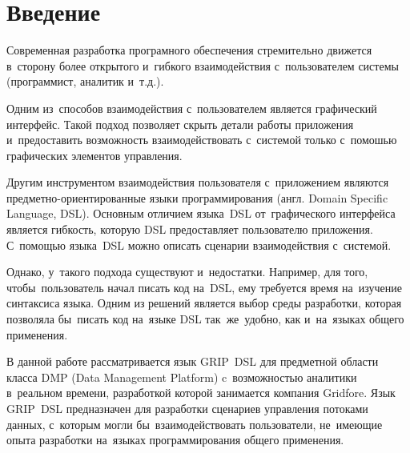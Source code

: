 \chapter*{Введение}                         %



Современная разработка програмного обеспечения стремительно движется в~сторону более открытого и~гибкого взаимодействия с~пользователем системы (программист, аналитик и~т.д.). 

Одним из~способов взаимодействия с~пользователем является графический интерфейс. Такой подход позволяет скрыть детали работы приложения и~предоставить возможность взаимодействовать с~системой только с~помошью графических элементов управления.

Другим инструментом взаимодействия пользователя с~приложением являются предметно-ориентированные языки программирования (англ. Domain Specific Language, DSL). Основным отличием языка~DSL от~графического интерфейса является гибкость, которую DSL предоставляет пользователю приложения. С~помощью языка~DSL можно описать сценарии взаимодействия с~системой. 

Однако, у~такого подхода существуют и~недостатки. Например, для того, чтобы~пользователь начал писать код на~DSL, ему требуется время на~изучение синтаксиса языка. Одним из решений является выбор среды разработки, которая позволяла бы~писать код на~языке DSL так~же~удобно, как и~на~языках общего применения. 

В данной работе рассматривается язык GRIP~DSL для предметной области класса DMP (Data Management Platform) c~возможностью аналитики в~реальном времени, разработкой которой занимается компания Gridfore. Язык GRIP~DSL предназначен для разработки сценариев управления потоками данных, с~которым могли бы~взаимодействовать пользователи, не~имеющие опыта разработки на~языках программирования общего применения.

